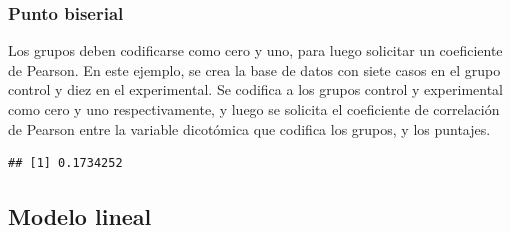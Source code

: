 \documentclass[]{book}
\newenvironment{Shaded}{\begin{snugshade}}{\end{snugshade}}
\newcommand{\DataTypeTok}[1]{\textcolor[rgb]{0.13,0.29,0.53}{#1}}
\newcommand{\DecValTok}[1]{\textcolor[rgb]{0.00,0.00,0.81}{#1}}
\newcommand{\FloatTok}[1]{\textcolor[rgb]{0.00,0.00,0.81}{#1}}
\newcommand{\KeywordTok}[1]{\textcolor[rgb]{0.13,0.29,0.53}{\textbf{#1}}}
\newcommand{\NormalTok}[1]{#1}
\newcommand{\OperatorTok}[1]{\textcolor[rgb]{0.81,0.36,0.00}{\textbf{#1}}}
\newcommand{\StringTok}[1]{\textcolor[rgb]{0.31,0.60,0.02}{#1}}
\begin{document}
\hypertarget{punto-biserial}{%
\subsubsection{Punto biserial}\label{punto-biserial}}

Los grupos deben codificarse como cero y uno, para luego solicitar un coeficiente de Pearson. En este ejemplo, se crea la base de datos con siete casos en el grupo control y diez en el experimental. Se codifica a los grupos control y experimental como cero y uno respectivamente, y luego se solicita el coeficiente de correlación de Pearson entre la variable dicotómica que codifica los grupos, y los puntajes.

\begin{Shaded}
\end{Shaded}

\begin{verbatim}
## [1] 0.1734252
\end{verbatim}

\hypertarget{modelo-lineal}{%
\subsection{Modelo lineal}\label{modelo-lineal}}
\end{document}
